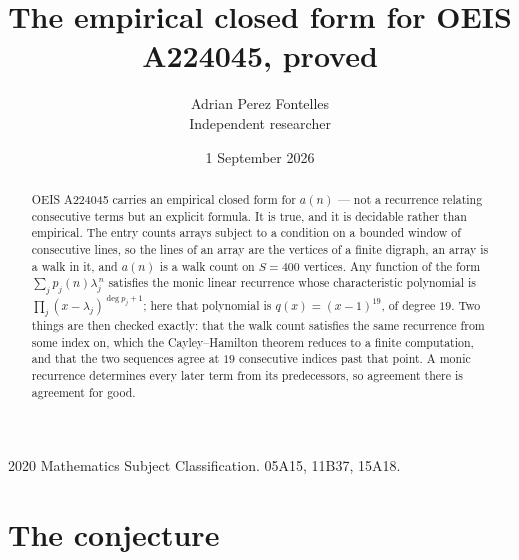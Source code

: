 \documentclass[11pt,a4paper]{article}
\title{The empirical closed form for OEIS A224045, proved}
\author{Adrian Perez Fontelles\\ \small Independent researcher}
\date{1 September 2026}
\theoremstyle{plain}
\theoremstyle{definition}
\begin{document}
\maketitle

\begin{abstract}
OEIS A224045 carries an empirical closed form for $a(n)$ --- not a recurrence relating
consecutive terms but an explicit formula. It is true, and it is decidable rather than
empirical. The entry counts arrays subject to a condition on a bounded window of consecutive lines, so the lines of an array are the
vertices of a finite digraph, an array is a walk in it, and $a(n)$ is a walk count on
$S=400$ vertices. Any function of the form $\sum_j p_j(n)\lambda_j^{\,n}$ satisfies the
monic linear recurrence whose characteristic polynomial is
$\prod_j(x-\lambda_j)^{\deg p_j+1}$; here that polynomial is $q(x)=(x-1)^{19}$, of degree
$19$. Two things are then checked exactly: that the walk count satisfies the same
recurrence from some index on, which the Cayley--Hamilton theorem reduces to a finite
computation, and that the two sequences agree at $19$ consecutive indices past that
point. A monic recurrence determines every later term from its predecessors, so agreement
there is agreement for good.
\end{abstract}

\noindent\small 2020 Mathematics Subject Classification. 05A15, 11B37, 15A18.\normalsize

\section{The conjecture}
\end{document}
